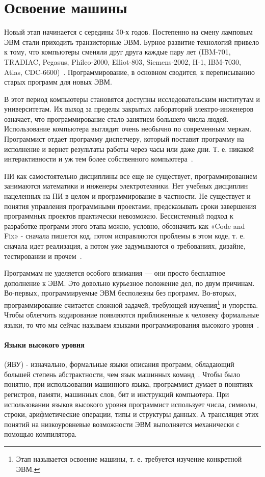 \section{Освоение машины}

Новый этап начинается с середины 50-х годов. Постепенно на смену ламповым ЭВМ стали приходить транзисторные ЭВМ. Бурное развитие технологий привело к тому, что компьютеры сменяли друг друга каждые пару лет (IBM-701, TRADIAC, Pegasus, Philco-2000, Elliot-803, Siemens-2002, H-1, IBM-7030, Atlas, CDC-6600)~\cite{Glass}. Программирование, в основном сводится, к переписыванию старых программ для новых ЭВМ.

В этот период компьютеры становятся доступны исследовательским институтам и университетам. Их выход за пределы закрытых лабораторий электро-инженеров означает, что программирование стало занятием большего числа людей. Использование компьютера выглядит очень необычно по современным меркам. Программист отдает программу диспетчеру, который поставит программу на исполнение и вернет результаты работы через часы или даже дни. Т. е. никакой интерактивности и уж тем более собственного компьютера~\cite{Wirth:2008:HIST}.

ПИ как самостоятельно дисциплины все еще не существует, программированием занимаются математики и инженеры электротехники. Нет учебных дисциплин нацеленных на ПИ в целом и программирование в частности. Не существует и понятия управления программными проектами, предсказывать сроки завершения программных проектов практически невозможно. Бессистемный подход к разработке программ этого этапа можно, условно, обозначить как «Code and Fix» - сначала пишется код, потом исправляются проблемы в этом коде, т. е. сначала идет реализация, а потом уже задумываются о требованиях, дизайне, тестировании и прочем~\cite{Boehm:1988:SMSD}.

Программам не уделяется особого внимания — они просто бесплатное дополнение к ЭВМ. Это довольно курьезное положение дел, по двум причинам. Во-первых, программируемые ЭВМ бесполезны без программ. Во-вторых, программирование считается сложной задачей, требующей изучения\footnote{Этап называется освоение машины, т. е. требуется изучение конкретной ЭВМ.} и упорства. Чтобы облегчить кодирование появляются приближенные к человеку формальные языки, то что мы сейчас называем языками программирования высокого уровня~\cite{Wirth:2008:HIST}.

\paragraph{Языки высокого уровня} (ЯВУ) - изначально, формальные языки описания программ, обладающий большей степень абстрактности, чем язык машинных команд~\cite{HLPL}. Чтобы было понятно, при использовании машинного языка, программист думает в понятиях регистров, памяти, машинных слов, бит и инструкций компьютера. При использовании языков высокого уровня программист использует числа, символы, строки, арифметические операции, типы и структуры данных. А трансляция этих понятий на низкоуровневые возможности ЭВМ выполняется механически с помощью компилятора.


